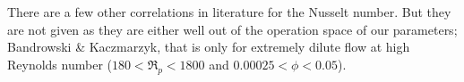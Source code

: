 There are a few other correlations in literature for the Nusselt number. But they are not given as they are either well out of the operation space of our parameters; Bandrowski \& Kaczmarzyk\cite{Bandrowski1977}, that is only for extremely dilute flow at high Reynolds number ($180 < \Re_p < 1800$ and $0.00025 < \phi < 0.05$).









\cite{Romkes2003}